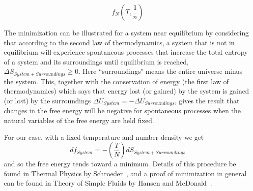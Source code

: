\documentclass[double,12pt]{beavtex}
\begin{document}
\begin{equation}f_N(T,\frac{1}{n})\end{equation}

The minimization can be illustrated for a system near 
equilibrium by considering that according to the 
second law of thermodynamics, a system that is not in equilibrium will 
experience spontaneous processes that increase the total entropy of a 
system and its surroundings until equilibrium is reached, 
$\Delta{S}_{System + Surroundings} \geq 0$. Here ``surroundings" means 
the entire universe minus the system. This, together with the conservation 
of energy (the first law of thermodynamics) which says that energy lost 
(or gained) by the system is gained (or lost) by the surroundings 
$\Delta{U}_{System}=-\Delta{U}_{Surroundings}$, gives the result that 
changes in the free energy 
will be negative for spontaneous processes 
when the natural variables of the free energy are held fixed. 

For our case, with a fixed temperature and number density we get
\begin{equation}
  df_{System}=-\left(\frac{T}{N}\right)dS_{System+Surroundings}
\end{equation}
and so the free energy tends toward a minimum. 
Details of this procedure be found in Thermal Physics by Schroeder~\cite{schroeder}, 
and a proof of minimization in general can be found in 
Theory of Simple Fluids by Hansen and McDonald~\cite{Hansen}.
\end{document}
